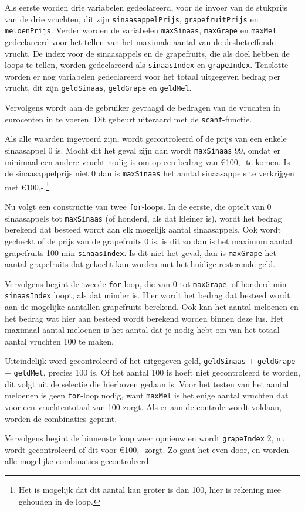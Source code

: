 Als eerste worden drie variabelen gedeclareerd, voor de invoer van de stukprijs van de drie vruchten, dit zijn {\tt sinaasappelPrijs}, {\tt grapefruitPrijs} en {\tt meloenPrijs}.
Verder worden de variabelen {\tt maxSinaas}, {\tt maxGrape} en {\tt maxMel} gedeclareerd voor het tellen van het maximale aantal van de desbetreffende vrucht.
De index voor de sinaasappels en de grapefruits, die als doel hebben de loops te tellen, worden gedeclareerd als {\tt sinaasIndex} en {\tt grapeIndex}.
Tenslotte worden er nog variabelen gedeclareerd voor het totaal uitgegeven bedrag per vrucht, dit zijn {\tt geldSinaas}, {\tt geldGrape} en {\tt geldMel}.

Vervolgens wordt aan de gebruiker gevraagd de bedragen van de vruchten in eurocenten in te voeren.
Dit gebeurt uiteraard met de {\tt scanf}-functie.

Als alle waarden ingevoerd zijn, wordt gecontroleerd of de prijs van een enkele sinaasappel 0 is.
Mocht dit het geval zijn dan wordt {\tt maxSinaas} 99, omdat er minimaal een andere vrucht nodig is om op een bedrag van \euro100,- te komen.
Is de sinaasappelprijs niet 0 dan is {\tt maxSinaas} het aantal sinaasappels te verkrijgen met \euro100,-.\footnote{Het is mogelijk dat dit aantal kan groter is dan 100, hier is rekening mee gehouden in de loop.}

Nu volgt een constructie van twee {\tt for}-loops.
In de eerste, die optelt van 0 sinaasappels tot {\tt maxSinaas} (of honderd, als dat kleiner is), wordt het bedrag berekend dat besteed wordt aan elk mogelijk aantal sinaasappels.
Ook wordt gecheckt of de prijs van de grapefruits 0 is, is dit zo dan is het maximum aantal grapefruits 100 min {\tt sinaasIndex}.
Is dit niet het geval, dan is {\tt maxGrape} het aantal grapefruits dat gekocht kan worden met het huidige resterende geld.

Vervolgens begint de tweede {\tt for}-loop, die van 0 tot {\tt maxGrape}, of honderd min {\tt sinaasIndex} loopt, als dat minder is. Hier wordt het bedrag dat besteed wordt aan de mogelijke aantallen grapefruits berekend.
Ook kan het aantal meloenen en het bedrag wat hier aan besteed wordt berekend worden binnen deze lus.
Het maximaal aantal meloenen is het aantal dat je nodig hebt om van het totaal aantal vruchten 100 te maken.

Uiteindelijk word gecontroleerd of het uitgegeven geld, {\tt geldSinaas} + {\tt geldGrape} + {\tt geldMel}, precies 100 is.
Of het aantal 100 is hoeft niet gecontroleerd te worden, dit volgt uit de selectie die hierboven gedaan is.
Voor het testen van het aantal meloenen is geen {\tt for}-loop nodig, want {\tt maxMel} is het enige aantal vruchten dat voor een vruchtentotaal van 100 zorgt.
Als er aan de controle wordt voldaan, worden de combinaties geprint.

Vervolgens begint de binnenste loop weer opnieuw en wordt {\tt grapeIndex} 2, nu wordt gecontroleerd of dit voor \euro100,- zorgt. Zo gaat het even door, en worden alle mogelijke combinaties gecontroleerd.

